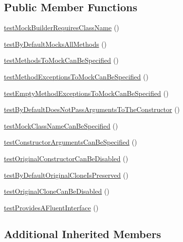 \subsection*{Public Member Functions}
\begin{DoxyCompactItemize}
\item 
\mbox{\hyperlink{class_framework___mock_builder_test_a18c1e67f1648798fc4905de7b395491c}{test\+Mock\+Builder\+Requires\+Class\+Name}} ()
\item 
\mbox{\hyperlink{class_framework___mock_builder_test_a180f82638a156049a66cc79f0536cc4e}{test\+By\+Default\+Mocks\+All\+Methods}} ()
\item 
\mbox{\hyperlink{class_framework___mock_builder_test_a3dfb5d9cf017c8996bea40518607b791}{test\+Methods\+To\+Mock\+Can\+Be\+Specified}} ()
\item 
\mbox{\hyperlink{class_framework___mock_builder_test_a5448566d87373f75618a76f635aedf98}{test\+Method\+Exceptions\+To\+Mock\+Can\+Be\+Specified}} ()
\item 
\mbox{\hyperlink{class_framework___mock_builder_test_a89a27b8494cf256030469c014723c5fa}{test\+Empty\+Method\+Exceptions\+To\+Mock\+Can\+Be\+Specified}} ()
\item 
\mbox{\hyperlink{class_framework___mock_builder_test_ac8d27e8cc06939b84c0afe5744ba6736}{test\+By\+Default\+Does\+Not\+Pass\+Arguments\+To\+The\+Constructor}} ()
\item 
\mbox{\hyperlink{class_framework___mock_builder_test_ad2f99f53ddec7a5af792983772ece154}{test\+Mock\+Class\+Name\+Can\+Be\+Specified}} ()
\item 
\mbox{\hyperlink{class_framework___mock_builder_test_a7622d0a2781c8c57bdc678e3361e0d4a}{test\+Constructor\+Arguments\+Can\+Be\+Specified}} ()
\item 
\mbox{\hyperlink{class_framework___mock_builder_test_a47d6cb0fdbc91b110e1c8c1ed53f52b1}{test\+Original\+Constructor\+Can\+Be\+Disabled}} ()
\item 
\mbox{\hyperlink{class_framework___mock_builder_test_ae13926a7ef28e9684d31c9a0aca9af4d}{test\+By\+Default\+Original\+Clone\+Is\+Preserved}} ()
\item 
\mbox{\hyperlink{class_framework___mock_builder_test_a0a32a9673d64158ff742b001e992853d}{test\+Original\+Clone\+Can\+Be\+Disabled}} ()
\item 
\mbox{\hyperlink{class_framework___mock_builder_test_a957aa3cf80b1f0e0e5b1d758a605d37f}{test\+Provides\+A\+Fluent\+Interface}} ()
\end{DoxyCompactItemize}
\subsection*{Additional Inherited Members}



